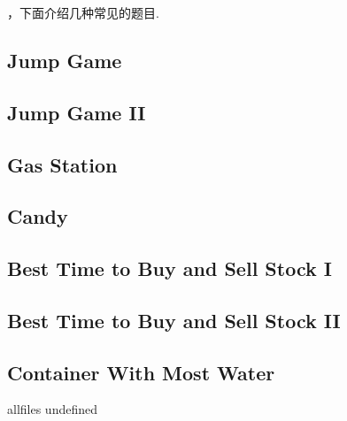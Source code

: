 \documentclass{article}
\begin{document}
\begin{CJK}{UTF8}{gbsn}     %

\else
    
，下面介绍几种常见的题目.
\\
\fi
\subsection{Jump Game}

\subsection{Jump Game II}

\subsection{Gas Station}

\subsection{Candy}

\subsection{Best Time to Buy and Sell Stock I}

\subsection{Best Time to Buy and Sell Stock II}

\subsection{Container With Most Water}


\ifx allfiles undefined
\end{CJK}
\end{document}
